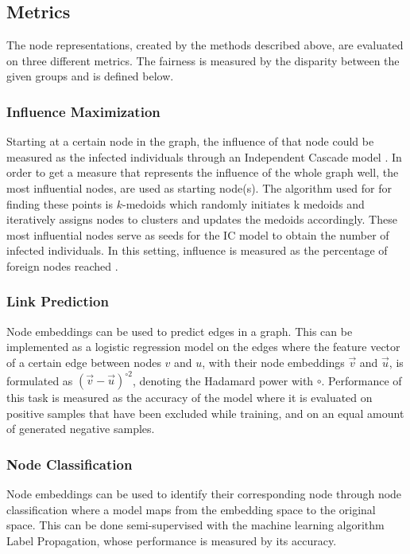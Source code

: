 \subsection{Metrics}

The node representations, created by the methods described above, are evaluated on three different metrics. The fairness is measured by the disparity between the given groups and is defined below.
 

\subsubsection{Influence Maximization} Starting at a certain node in the graph, the influence of that node could be measured as the infected individuals through an Independent Cascade model \cite{ICmodel}. In order to get a measure that represents the influence of the whole graph well, the most influential nodes, are used as starting node(s). The algorithm used for for finding these points is $k$-medoids which randomly initiates k medoids and iteratively assigns nodes to clusters and updates the medoids accordingly. These most influential nodes serve as seeds for the IC model to obtain the number of infected individuals. In this setting, influence is measured as the percentage of foreign nodes reached \cite{chen2009efficient}.

\subsubsection{Link Prediction} Node embeddings can be used to predict edges in a graph. This can be implemented as a logistic regression model on the edges where the feature vector of a certain edge between nodes $v$ and $u$, with their node embeddings $\vec{v}$ and $\vec{u}$, is formulated as $(\vec{v}-\vec{u})^{\circ2}$, denoting the Hadamard power with $\circ$. Performance of this task is measured as the accuracy of the model where it is evaluated on positive samples that have been excluded while training, and on an equal amount of generated negative samples.

\subsubsection{Node Classification} Node embeddings can be used to identify their corresponding node through node classification where a model maps from the embedding space to the original space. This can be done semi-supervised with the machine learning algorithm Label Propagation, whose performance is measured by its accuracy. 

